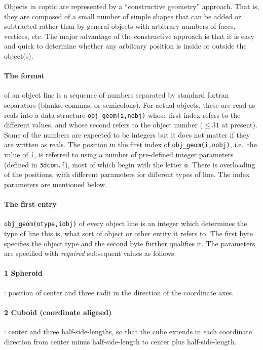 \documentclass[12pt]{article}
\begin{document}
Objects in coptic are represented by a ``constructive geometry''
approach. That is, they are composed of a small number of simple
shapes that can be added or subtracted rather than by general objects
with arbitrary numbers of faces, vertices, etc. The major advantage of
the constructive approach is that it is easy and quick to determine
whether any arbitrary position is inside or outside the object(s).

\paragraph{The format} of an object line is a sequence of numbers
separated by standard fortran separators (blanks, commas, or
semicolons). For actual objects, these are read as reals into a data
structure \verb!obj_geom(i,nobj)! whose first index refers to the
different values, and whose second refers to the object number
($\le31$ at present).  Some of the numbers are expected to be integers
but it does not matter if they are written as reals. The position in
the first index of \verb!obj_geom(i,nobj)!, i.e.\ the value of
\verb!i!, is referred to using a number of pre-defined integer
parameters (defined in \verb!3dcom.f!), most of which begin with the
letter \verb!o!. There is overloading of the positions, with different
parameters for different types of line. The index parameters are
mentioned below.

\paragraph{The first entry} 
\verb!obj_geom(otype,iobj)! of every object line is an integer which
determines the type of line this is, what sort of object or other
entity it refers to. The first byte specifies the object type and the
second byte further qualifies it. The parameters are specified with
\emph{required} subsequent values as follows:

\paragraph{1 Spheroid}: position of center and three radii in the
direction of the coordinate axes.

\paragraph{2 Cuboid (coordinate aligned)}: center and three
half-side-lengths, so that the cube extends in each coordinate
direction from center minus half-side-length to center plus
half-side-length.
\end{document}
